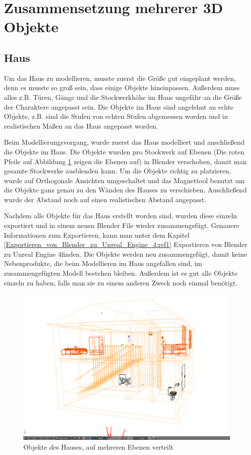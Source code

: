 \section{Zusammensetzung mehrerer 3D Objekte}
\subsection{Haus}
\label{haus:ref1}
Um das Haus zu modellieren, musste zuerst die Größe gut eingeplant werden, denn es musste so groß sein, dass einige Objekte hineinpassen.
Außerdem muss alles z.B. Türen, Gänge und die Stockwerkhöhe im Haus ungefähr an die Größe der Charaktere angepasst sein.
Die Objekte im Haus sind angelehnt an echte Objekte, z.B. sind die Stufen von echten Stufen abgemessen worden und in realistischen Maßen an das Haus angepasst worden.

Beim Modellierungsvorgang, wurde zuerst das Haus modelliert und anschließend die Objekte im Haus. Die Objekte wurden pro Stockwerk auf Ebenen (Die roten Pfeile auf Abbildung \ref{Haus:image1} zeigen
die Ebenen auf)  in Blender verschoben, damit man gesamte Stockwerke ausblenden kann. Um die Objekte richtig zu platzieren, wurde auf Orthogonale Ansichten umgeschaltet
und das Magnettool benutzt um die Objekte ganz genau zu den Wänden des Hauses zu verschieben. Anschließend wurde der Abstand noch auf einen realistischen Abstand angepasst.

Nachdem alle Objekte für das Haus erstellt worden sind, wurden diese einzeln exportiert und in einem neuen Blender File wieder zusammengefügt. Genauere Informationen zum Exportieren, kann
man unter dem Kapitel \ref{Exportieren_von_Blender_zu_Unreal_Engine_4:ref1} \dq Exportieren von Blender zu Unreal Engine 4\dq finden. Die Objekte werden neu zusammengefügt, damit keine Nebenprodukte, die beim Modellieren
im Haus angefallen sind, im zusammengefügten Modell bestehen bleiben. Außerdem ist es gut alle Objekte einzeln zu haben, falls man sie zu einem anderen Zweck noch einmal benötigt.

\begin{figure}[h]
    \centering
    \includegraphics[width=.8\textwidth]{images/Haus-zusammenfuegen_Ebenen.png}
    \caption{Objekte des Hauses, auf mehreren Ebenen verteilt}
    \label{Haus:image1}
\end{figure}